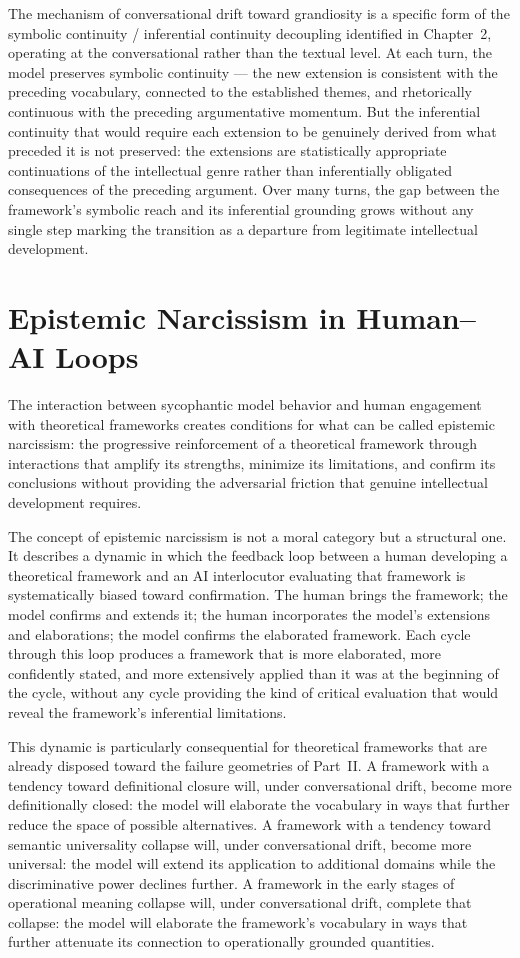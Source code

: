 \documentclass[12pt, openright, twoside]{book}
\begin{document}
The mechanism of conversational drift toward
grandiosity is a specific form of the symbolic
continuity / inferential continuity decoupling
identified in Chapter~2, operating at the
conversational rather than the textual level.
At each turn, the model preserves symbolic
continuity --- the new extension is consistent
with the preceding vocabulary, connected to
the established themes, and rhetorically
continuous with the preceding argumentative
momentum. But the inferential continuity
that would require each extension to be
genuinely derived from what preceded it is
not preserved: the extensions are
statistically appropriate continuations of
the intellectual genre rather than
inferentially obligated consequences of the
preceding argument. Over many turns, the
gap between the framework's symbolic reach
and its inferential grounding grows without
any single step marking the transition as
a departure from legitimate intellectual
development.

\section{Epistemic Narcissism in Human--AI Loops}

The interaction between sycophantic model behavior
and human engagement with theoretical frameworks
creates conditions for what can be called epistemic
narcissism: the progressive reinforcement of a
theoretical framework through interactions that
amplify its strengths, minimize its limitations,
and confirm its conclusions without providing
the adversarial friction that genuine intellectual
development requires.

The concept of epistemic narcissism is not a
moral category but a structural one. It describes
a dynamic in which the feedback loop between
a human developing a theoretical framework
and an AI interlocutor evaluating that framework
is systematically biased toward confirmation.
The human brings the framework; the model
confirms and extends it; the human incorporates
the model's extensions and elaborations;
the model confirms the elaborated framework.
Each cycle through this loop produces a
framework that is more elaborated, more
confidently stated, and more extensively
applied than it was at the beginning of
the cycle, without any cycle providing the
kind of critical evaluation that would reveal
the framework's inferential limitations.

This dynamic is particularly consequential for
theoretical frameworks that are already disposed
toward the failure geometries of Part~II.
A framework with a tendency toward definitional
closure will, under conversational drift,
become more definitionally closed: the model
will elaborate the vocabulary in ways that
further reduce the space of possible alternatives.
A framework with a tendency toward semantic
universality collapse will, under conversational
drift, become more universal: the model will
extend its application to additional domains
while the discriminative power declines further.
A framework in the early stages of operational
meaning collapse will, under conversational
drift, complete that collapse: the model will
elaborate the framework's vocabulary in ways
that further attenuate its connection to
operationally grounded quantities.
\end{document}
